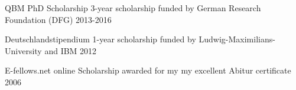 



\begin{cvhonors}

  \cvhonor
    {QBM PhD Scholarship} %
    {3-year scholarship funded by German Research Foundation (DFG) } %
    {} %
    {2013-2016} %


  \cvhonor
    {Deutschlandstipendium} %
    {1-year scholarship funded by Ludwig-Maximilians-University and IBM} %
    {} %
    {2012} %

  \cvhonor
    {E-fellows.net} %
    {online Scholarship awarded for my my excellent Abitur certificate} %
    {} %
    {2006} %

\end{cvhonors}
